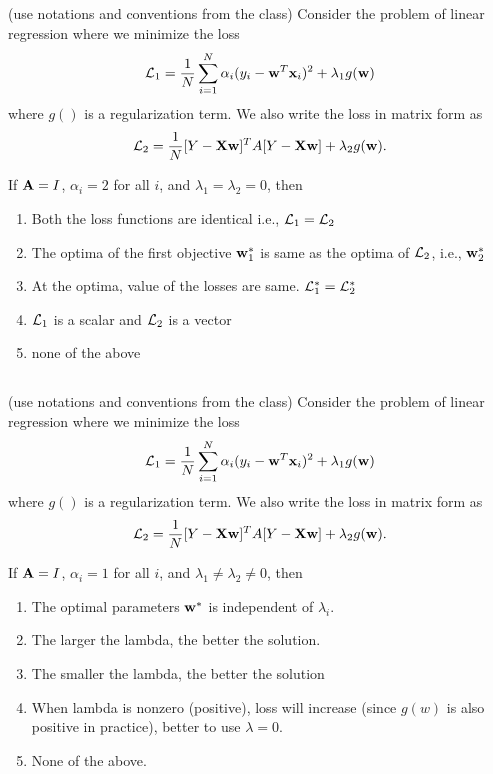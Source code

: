 \begin{frame}
\section{}
  (use notations  and conventions from the class) Consider the problem of linear regression where we minimize the loss
  \[{\cal L}_1 = \frac{1}{N}\sum_{i=1}^N \alpha_i (y_i - {\bf w}^T{\bf x}_i)^2 + \lambda_1 g({\bf w})\] where $g()$ is a regularization term. We also write the loss in matrix form as
  \[ {\cal L}_2 = \frac{1}{N} [Y-{\bf X}{\bf w}]^TA[Y-{\bf X}{\bf w}] + \lambda_2 g({\bf w}). \]


  If ${\bf A} = I$, $\alpha_i = 2$ for all $i$, and $\lambda_1 = \lambda_2 = 0$, then
    \begin{enumerate}[label=(\Alph*)]
     \item Both the loss functions are identical i.e., ${\cal L}_1 = {\cal L}_2$
     \item The optima of the first objective ${\bf w}_1^*$ is same as the optima of ${\cal L}_2$, i.e., ${\bf w}_2^*$  %
     \item At the optima, value of the losses are same. ${\cal L}_1^* = {\cal L}_2^*$
     \item ${\cal L}_1$ is a scalar and ${\cal L}_2$ is a vector
     \item none of the above    %
    \end{enumerate}
\end{frame}

\begin{frame}
\section{}
  (use notations  and conventions from the class) Consider the problem of linear regression where we minimize the loss
  \[{\cal L}_1 = \frac{1}{N}\sum_{i=1}^N \alpha_i (y_i - {\bf w}^T{\bf x}_i)^2 + \lambda_1 g({\bf w})\] where $g()$ is a regularization term. We also write the loss in matrix form as
  \[ {\cal L}_2 = \frac{1}{N} [Y-{\bf X}{\bf w}]^TA[Y-{\bf X}{\bf w}] + \lambda_2 g({\bf w}). \]


  If ${\bf A} = I$, $\alpha_i = 1$ for all $i$, and $\lambda_1 \neq \lambda_2 \neq 0$, then
    \begin{enumerate}[label=(\Alph*)]
     \item The optimal parameters ${\bf w}^*$ is independent of $\lambda_i$.
     \item The larger the lambda, the better the solution.
     \item The smaller the lambda, the better the solution
     \item When lambda is nonzero (positive), loss will increase (since $g(w)$ is also positive in practice), better to use $\lambda=0$.
     \item None of the above.   %
    \end{enumerate}
\end{frame}

